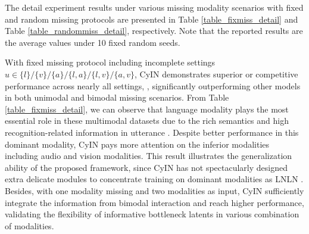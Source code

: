 \documentclass{article}
\begin{document}
\begin{table}[htbp]
{\begin{tabular}{cccccccccccccc}
    
    \bottomrule[1.5pt]
    
\end{tabular}
}
\end{table}


The detail experiment results under various missing  modality scenarios with fixed and random missing protocols are presented in Table \ref{table_fixmiss_detail} and Table \ref{table_randommiss_detail}, respectively. Note that the reported results are the average values under 10 fixed random seeds. 

With fixed missing protocol including incomplete settings $u\in\{l\}/\{v\}/\{a\}/\{l,a\}/\{l,v\}/\{a,v\}$,  CyIN demonstrates superior or competitive performance across nearly all settings, , significantly outperforming other models in both unimodal and bimodal missing scenarios. From Table \ref{table_fixmiss_detail}, we can observe that language modality plays the most essential role in these multimodal datasets due to the rich semantics and high recognition-related information in utterance \cite{pham2019found,hazarika2020misa,lin2023dynamically}. Despite better performance in this dominant modality, CyIN pays more attention on the inferior modalities including audio and vision modalities. This result illustrates the generalization ability of the proposed framework, since CyIN has not spectacularly designed extra delicate modules to concentrate training on dominant modalities as LNLN \cite{zhang2024towards}. Besides, with one modality missing and two modalities as input, CyIN sufficiently integrate the information from bimodal interaction and reach higher performance, validating the flexibility of informative bottleneck latents in various combination of modalities.
\end{document}
